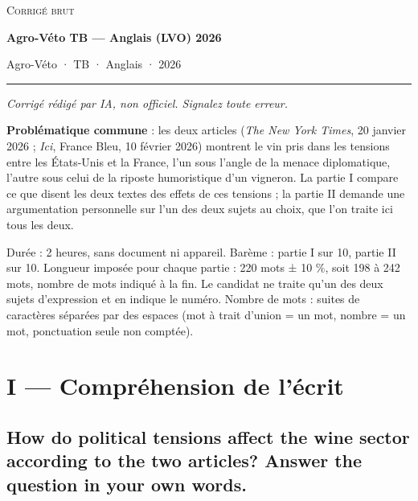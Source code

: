 \documentclass[11pt,a4paper]{article}
\begin{document}
\thispagestyle{plain}
\begin{center}
  {\small\scshape Corrigé brut}\par\smallskip
  {\LARGE\bfseries Agro-Véto TB — Anglais (LVO) 2026\par}\medskip
  {\large Agro-Véto · TB · Anglais · 2026\par}
\end{center}
\vspace{2pt}\hrule\vspace{8pt}

\emph{Corrigé rédigé par IA, non officiel. Signalez toute erreur.}

\textbf{Problématique commune} : les deux articles (\emph{The New York Times}, 20 janvier 2026 ; \emph{Ici}, France Bleu, 10 février 2026) montrent le vin pris dans les tensions entre les États-Unis et la France, l'un sous l'angle de la menace diplomatique, l'autre sous celui de la riposte humoristique d'un vigneron. La partie I compare ce que disent les deux textes des effets de ces tensions ; la partie II demande une argumentation personnelle sur l'un des deux sujets au choix, que l'on traite ici tous les deux.

Durée : 2 heures, sans document ni appareil. Barème : partie I sur 10, partie II sur 10. Longueur imposée pour chaque partie : 220 mots ± 10 \%, soit 198 à 242 mots, nombre de mots indiqué à la fin. Le candidat ne traite qu'un des deux sujets d'expression et en indique le numéro. Nombre de mots : suites de caractères séparées par des espaces (mot à trait d'union = un mot, nombre = un mot, ponctuation seule non comptée).

\hypertarget{i-compruxe9hension-de-luxe9crit}{%
\section{I --- Compréhension de l'écrit}\label{i-compruxe9hension-de-luxe9crit}}

\hypertarget{how-do-political-tensions-affect-the-wine-sector-according-to-the-two-articles-answer-the-question-in-your-own-words.}{%
\subsection{How do political tensions affect the wine sector according to the two articles? Answer the question in your own words.}\label{how-do-political-tensions-affect-the-wine-sector-according-to-the-two-articles-answer-the-question-in-your-own-words.}}
\end{document}

